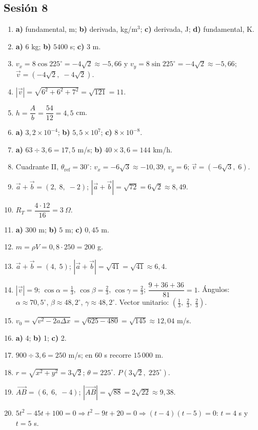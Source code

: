 \documentclass[12pt, letterpaper]{article}
\providecommand{\sen}{\sin}
\begin{document}
\subsection*{Sesión 8}
\begin{enumerate}[leftmargin=*, label=\textbf{\arabic*.}]
  \item \textbf{a)} fundamental, m; \textbf{b)} derivada, kg/m$^3$; \textbf{c)} derivada, J; \textbf{d)} fundamental, K.
  \item \textbf{a)} $6$ kg; \textbf{b)} $5400$ s; \textbf{c)} $3$ m.
  \item $v_x=8\cos 225^{\circ}=-4\sqrt{2}\approx -5{,}66$ y $v_y=8\sen 225^{\circ}=-4\sqrt{2}\approx -5{,}66$; $\vec v=(-4\sqrt{2},\; -4\sqrt{2})$.
  \item $|\vec v|=\sqrt{6^2+6^2+7^2}=\sqrt{121}=11$.
  \item $h=\dfrac{A}{b}=\dfrac{54}{12}=4{,}5$ cm.
  \item \textbf{a)} $3{,}2 \times 10^{-4}$; \textbf{b)} $5{,}5 \times 10^{7}$; \textbf{c)} $8 \times 10^{-8}$.
  \item \textbf{a)} $63 \div 3{,}6 = 17{,}5$ m/s; \quad \textbf{b)} $40 \times 3{,}6 = 144$ km/h.
  \item Cuadrante II, $\theta_{\text{ref}}=30^{\circ}$: $v_x=-6\sqrt{3}\approx -10{,}39$, $v_y=6$; $\vec v=(-6\sqrt{3},\; 6)$.
  \item $\vec a+\vec b=(2,\; 8,\; -2)$; $|\vec a+\vec b|=\sqrt{72}=6\sqrt{2}\approx 8{,}49$.
  \item $R_T=\dfrac{4\cdot 12}{16}=3\ \Omega$.
  \item \textbf{a)} $300$ m; \textbf{b)} $5$ m; \textbf{c)} $0{,}45$ m.
  \item $m=\rho V=0{,}8\cdot 250=200$ g.
  \item $\vec a+\vec b=(4,\; 5)$; $|\vec a+\vec b|=\sqrt{41}=\sqrt{41}\approx 6{,}4$.
  \item $|\vec v|=9$; $\cos\alpha=\frac{1}{3}$, $\cos\beta=\frac{2}{3}$, $\cos\gamma=\frac{2}{3}$; $\dfrac{9+36+36}{81}=1$. \checkmark\quad Ángulos: $\alpha\approx 70{,}5^{\circ}$, $\beta\approx 48{,}2^{\circ}$, $\gamma\approx 48{,}2^{\circ}$. Vector unitario: $(\frac{1}{3},\; \frac{2}{3},\; \frac{2}{3})$.
  \item $v_0=\sqrt{v^2-2a\Delta x}=\sqrt{625-480}=\sqrt{145}\approx 12{,}04$ m/s.
  \item \textbf{a)} 4; \quad \textbf{b)} 1; \quad \textbf{c)} 2.
  \item $900\div 3{,}6=250$ m/s; en $60$ s recorre $15\,000$ m.
  \item $r=\sqrt{x^2+y^2}=3\sqrt{2}$; $\theta=225^{\circ}$. $P(3\sqrt{2},\; 225^{\circ})$.
  \item $\overrightarrow{AB}=(6,\; 6,\; -4)$; $|\overrightarrow{AB}|=\sqrt{88}=2\sqrt{22}\approx 9{,}38$.
  \item $5t^2-45t+100=0\Rightarrow t^2-9t+20=0\Rightarrow(t-4)(t-5)=0$: $t=4$ s y $t=5$ s.
\end{enumerate}
\end{document}
